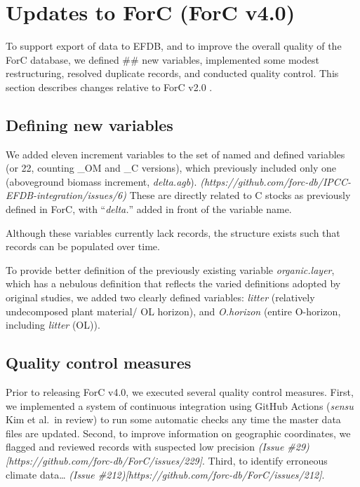 \documentclass[, manuscript]{copernicus}
\begin{document}
\section{Updates to ForC (ForC v4.0)}

To support export of data to EFDB, and to improve the overall quality of
the ForC database, we defined \#\# new variables, implemented some
modest restructuring, resolved duplicate records, and conducted quality
control. This section describes changes relative to ForC v2.0
\citep{anderson-teixeira_forc_2018}.

\subsection{Defining new variables}

We added eleven increment variables to the set of named and defined
variables (or 22, counting \_OM and \_C versions), which previously
included only one (aboveground biomass increment, \emph{delta.agb}).
\emph{(https://github.com/forc-db/IPCC-EFDB-integration/issues/6)} These
are directly related to C stocks as previously defined in ForC, with
``\emph{delta.}'' added in front of the variable name.

Although these variables currently lack records, the structure exists
such that records can be populated over time.

To provide better definition of the previously existing variable
\emph{organic.layer}, which has a nebulous definition that reflects the
varied definitions adopted by original studies, we added two clearly
defined variables: \emph{litter} (relatively undecomposed plant
material/ OL horizon), and \emph{O.horizon} (entire O-horizon, including
\emph{litter} (OL)).

\subsection{Quality control measures}

Prior to releasing ForC v4.0, we executed several quality control
measures. First, we implemented a system of continuous integration using
GitHub Actions (\emph{sensu} Kim et al.~in review) to run some automatic
checks any time the master data files are updated. Second, to improve
information on geographic coordinates, we flagged and reviewed records
with suspected low precision \emph{(Issue
\#29){[}https://github.com/forc-db/ForC/issues/229{]}}. Third, to
identify erroneous climate data\ldots{} \emph{(Issue
\#212){[}https://github.com/forc-db/ForC/issues/212{]}}.
\end{document}
